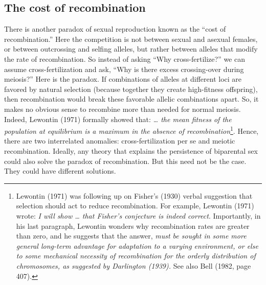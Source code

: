 \documentclass[
  letterpaper,
]{book}
\begin{document}
\hypertarget{the-cost-of-recombination}{%
\subsection{The cost of recombination}\label{the-cost-of-recombination}}

There is another paradox of sexual reproduction known as the ``cost of
recombination.'' Here the competition is not between sexual and asexual
females, or between outcrossing and selfing alleles, but rather between
alleles that modify the rate of recombination. So instead of asking
``Why cross-fertilize?'' we can assume cross-fertilization and ask,
``Why is there excess crossing-over during meiosis?'' Here is the
paradox. If combinations of alleles at different loci are favored by
natural selection (because together they create high-fitness offspring),
then recombination would break these favorable allelic combinations
apart. So, it makes no obvious sense to recombine more than needed for
normal meiosis. Indeed, Lewontin (1971) formally showed that:
\emph{\ldots{} the mean fitness of the population at equilibrium is a
maximum in the absence of recombination}\footnote{Lewontin (1971) was
  following up on Fisher's (1930) verbal suggestion that selection
  should act to reduce recombination. For example, Lewontin (1971)
  wrote: \emph{I will show \ldots{} that Fisher's conjecture is indeed
  correct}. Importantly, in his last paragraph, Lewontin wonders why
  recombination rates are greater than zero, and he suggests that the
  answer, \emph{must be sought in some more general long-term advantage
  for adaptation to a varying environment, or else to some mechanical
  necessity of recombination for the orderly distribution of
  chromosomes, as suggested by Darlington (1939).} See also Bell (1982,
  page 407).}. Hence, there are two interrelated anomalies:
cross-fertilization per se and meiotic recombination. Ideally, any
theory that explains the persistence of biparental sex could also solve
the paradox of recombination. But this need not be the case. They could
have different solutions.
\end{document}
